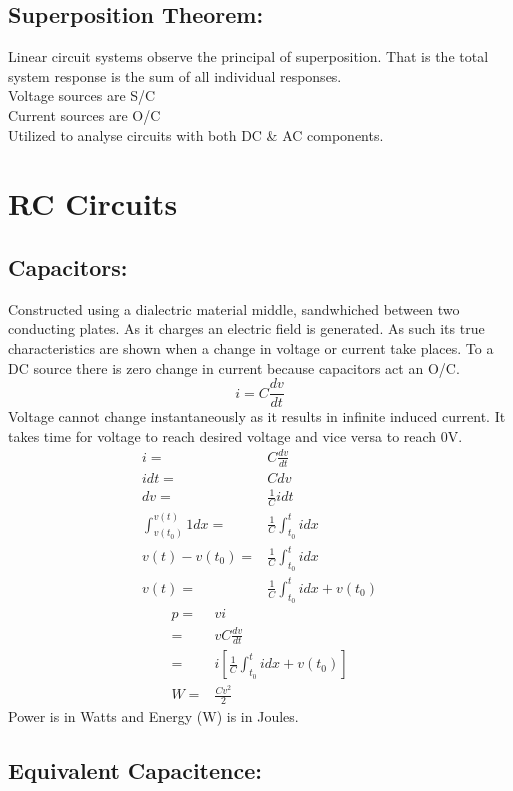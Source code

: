 \documentclass[a5paper]{article}
\begin{document}
	\subsection{Superposition Theorem:}
	Linear circuit systems observe the principal of superposition. That is the total system response is the sum of all individual responses.\\[1\baselineskip]
	Voltage sources are S/C\\
	Current sources are O/C\\[1\baselineskip]
	Utilized to analyse circuits with both DC \& AC components.

	\section{RC Circuits}
	\subsection{Capacitors:}
	Constructed using a dialectric material middle, sandwhiched between two conducting plates. As it charges an electric field is generated. As such its true characteristics are shown when a change in voltage or current take places. To a DC source there is zero change in current because capacitors act an O/C.
	$$i=C\frac{dv}{dt}$$
	Voltage cannot change instantaneously as it results in infinite induced current. It takes time for voltage to reach desired voltage and vice versa to reach 0V.
	\begin{align*}
		i=&C\frac{dv}{dt}\\
		idt=&Cdv\\
		dv=&\frac{1}{C}idt\\
		\int^{v(t)}_{v(t_{0})}1dx=&\frac{1}{C}\int^{t}_{t_{0}}idx\\
		v(t)-v(t_{0})=&\frac{1}{C}\int^{t}_{t_{0}}idx\\
		v(t)=&\frac{1}{C}\int^{t}_{t_{0}}idx+v(t_{0})
	\end{align*}
	\begin{align*}
		p=&vi\\
		=&vC\frac{dv}{dt}\\
		=&i[\frac{1}{C}\int^{t}_{t_{0}}idx+v(t_{0})]\\
		W=&\frac{Cv^{2}}{2}
	\end{align*}
	Power is in Watts and Energy (W) is in Joules.
	\subsection{Equivalent Capacitence:}
\end{document}

